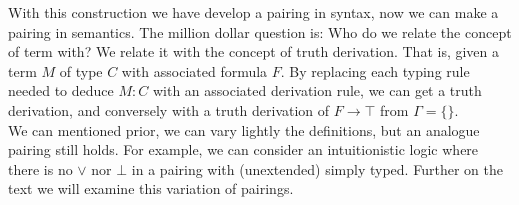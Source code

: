 With this construction we have develop a pairing in syntax,  now we can make a pairing in semantics. The million dollar question is: Who do we relate the concept of term with? We relate it with the concept of truth derivation. That is, given a term $M$  of type $C$ with associated formula $F$. By replacing each typing rule needed to deduce $M:C$  with an associated derivation rule, we can get a truth derivation, and conversely with a truth derivation of $F\to \top$ from $\Gamma=\{\}$.\\

We can mentioned prior, we can vary lightly the definitions, but an analogue pairing still holds. For example, we can consider an intuitionistic logic where there is no $\lor$ nor $\bot$ in a pairing with (unextended) simply typed. Further on the text we will examine this variation of pairings.

